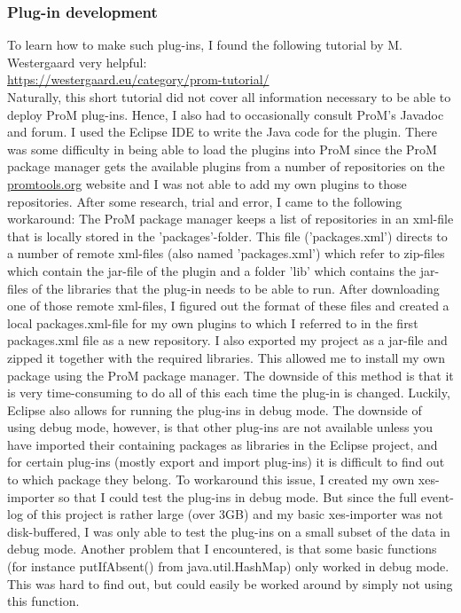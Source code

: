 \subsubsection{Plug-in development}
To learn how to make such plug-ins, I found the following tutorial by M. Westergaard very helpful:\\
\url{https://westergaard.eu/category/prom-tutorial/}\\
Naturally, this short tutorial did not cover all information necessary to be able to deploy ProM plug-ins. Hence, I also had to occasionally consult ProM's Javadoc and forum.
I used the Eclipse IDE to write the Java code for the plugin. There was some difficulty in being able to load the plugins into ProM since the ProM package manager gets the available plugins from a number of repositories on the \url{promtools.org} website and I was not able to add my own plugins to those repositories. After some research, trial and error, I came to the following workaround: The ProM package manager keeps a list of repositories in an xml-file that is locally stored in the 'packages'-folder. This file ('packages.xml') directs to a number of remote xml-files (also named 'packages.xml') which refer to zip-files which contain the jar-file of the plugin and a folder 'lib' which contains the jar-files of the libraries that the plug-in needs to be able to run. After downloading one of those remote xml-files, I figured out the format of these files and created a local packages.xml-file for my own plugins to which I referred to in the first packages.xml file as a new repository. I also exported my project as a jar-file and zipped it together with the required libraries. This allowed me to install my own package using the ProM package manager. The downside of this method is that it is very time-consuming to do all of this each time the plug-in is changed. Luckily, Eclipse also allows for running the plug-ins in debug mode. The downside of using debug mode, however, is that other plug-ins are not available unless you have imported their containing packages as libraries in the Eclipse project, and for certain plug-ins (mostly export and import plug-ins) it is difficult to find out to which package they belong. To workaround this issue, I created my own xes-importer so that I could test the plug-ins in debug mode. But since the full event-log of this project is rather large (over 3GB) and my basic xes-importer was not disk-buffered, I was only able to test the plug-ins on a small subset of the data in debug mode. Another problem that I encountered, is that some basic functions (for instance putIfAbsent() from java.util.HashMap) only worked in debug mode. This was hard to find out, but could easily be worked around by simply not using this function.

